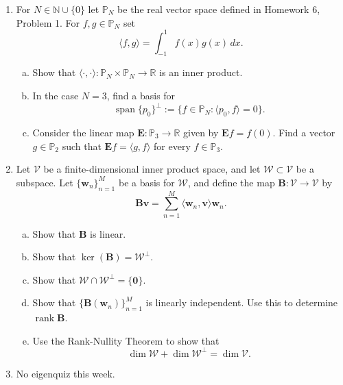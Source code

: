 \documentclass[12pt]{amsart}
\newcommand{\1}{\mathbbm{1}}
\newcounter{Theorem}
\numberwithin{equation}{section}
\numberwithin{Theorem}{section}
\theoremstyle{plain} %
\theoremstyle{definition}
\theoremstyle{remark}
\begin{document}
\thispagestyle{empty}

\bigskip


\begin{enumerate}[1.]

\item For \(N\in\mathbb{N}\cup\{0\}\) let \(\mathbb{P}_{N}\) be the real vector space defined in Homework 6, Problem 1. For \(f,g\in\mathbb{P}_{N}\) set
\[\langle f,g\rangle = \int_{-1}^{1}f(x)g(x)\,dx.\]

\begin{enumerate}[(a)]
\item Show that \(\langle\cdot,\cdot\rangle:\mathbb{P}_{N}\times\mathbb{P}_{N}\to\mathbb{R}\) is an inner product.\medskip

\item In the case \(N=3\), find a basis for 
\[\operatorname{span}\{p_{0}\}^{\bot}:=\{f\in\mathbb{P}_{N} : \langle p_{0},f\rangle = 0\}.\]

\item Consider the linear map \(\mathbf{E}:\mathbb{P}_{3}\to\mathbb{R}\) given by \(\mathbf{E}f = f(0)\). Find a vector \(g\in\mathbb{P}_{2}\) such that \(\mathbf{E}f = \langle g,f\rangle\) for every \(f\in\mathbb{P}_{3}\).

\end{enumerate}\bigskip


\item Let \(\mathcal{V}\) be a finite-dimensional inner product space, and let \(\mathcal{W}\subset \mathcal{V}\) be a subspace. Let \(\{\mathbf{w}_{n}\}_{n=1}^{M}\) be a basis for \(\mathcal{W}\), and define the map \(\mathbf{B}:\mathcal{V}\to\mathcal{V}\) by
\[\mathbf{B}\mathbf{v} = \sum_{n=1}^{M}\langle \mathbf{w}_{n},\mathbf{v}\rangle \mathbf{w}_{n}.\]\medskip

\begin{enumerate}[(a)]

\item Show that \(\mathbf{B}\) is linear.\medskip

\item Show that \(\operatorname{ker}(\mathbf{B}) = \mathcal{W}^{\bot}\).\medskip

\item Show that \(\mathcal{W}\cap\mathcal{W}^{\bot}=\{\mathbf{0}\}\).\medskip

\item Show that \(\{\mathbf{B}(\mathbf{w}_{n})\}_{n=1}^{M}\) is linearly independent. Use this to determine \(\operatorname{rank}\mathbf{B}\).\medskip

\item Use the Rank-Nullity Theorem to show that
\[\dim\mathcal{W} + \dim\mathcal{W}^{\bot} = \dim\mathcal{V}.\]

\end{enumerate}\bigskip

\item No eigenquiz this week.

\end{enumerate}
\end{document}

